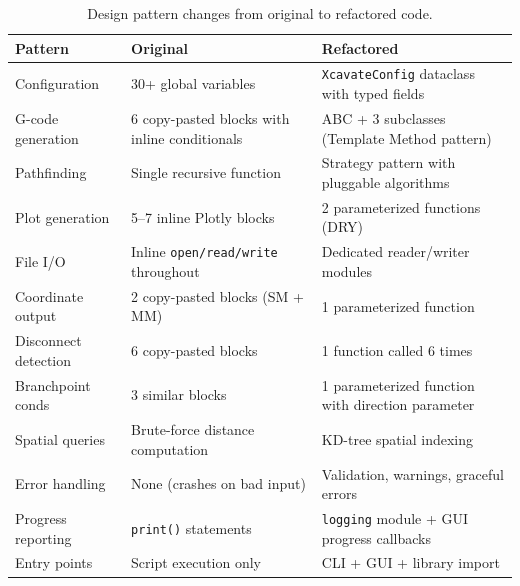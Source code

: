 \documentclass[11pt,letterpaper]{article}
\newcommand{\code}[1]{\texttt{#1}}
\begin{document}
\begin{table}[h]
\centering
\small
\begin{tabularx}{\textwidth}{L{3cm} X X}
\toprule
\textbf{Pattern} & \textbf{Original} & \textbf{Refactored} \\
\midrule
Configuration       & 30+ global variables                & \code{XcavateConfig} dataclass with typed fields \\
G-code generation   & 6 copy-pasted blocks with inline conditionals & ABC + 3 subclasses (Template Method pattern) \\
Pathfinding         & Single recursive function            & Strategy pattern with pluggable algorithms \\
Plot generation     & 5--7 inline Plotly blocks            & 2 parameterized functions (DRY) \\
File I/O            & Inline \code{open/read/write} throughout & Dedicated reader/writer modules \\
Coordinate output   & 2 copy-pasted blocks (SM + MM)       & 1 parameterized function \\
Disconnect detection & 6 copy-pasted blocks                & 1 function called 6 times \\
Branchpoint conds   & 3 similar blocks                    & 1 parameterized function with direction parameter \\
Spatial queries     & Brute-force distance computation     & KD-tree spatial indexing \\
Error handling      & None (crashes on bad input)           & Validation, warnings, graceful errors \\
Progress reporting  & \code{print()} statements            & \code{logging} module + GUI progress callbacks \\
Entry points        & Script execution only                & CLI + GUI + library import \\
\bottomrule
\end{tabularx}
\caption{Design pattern changes from original to refactored code.}
\end{table}
\end{document}
